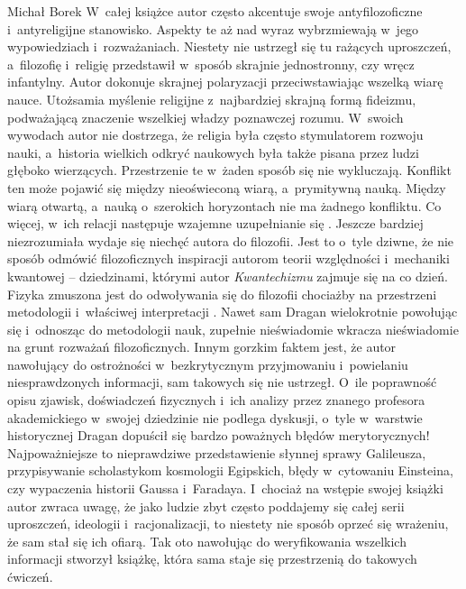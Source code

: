 \begin{newrevplenv}{Michał Borek}
W~całej książce autor często akcentuje swoje antyfilozoficzne i~antyreligijne stanowisko. Aspekty te aż nad wyraz wybrzmiewają w~jego wypowiedziach i~rozważaniach. Niestety nie ustrzegł się tu rażących uproszczeń, a~filozofię i~religię przedstawił w~sposób skrajnie jednostronny, czy wręcz infantylny. Autor dokonuje skrajnej polaryzacji przeciwstawiając wszelką wiarę nauce. Utożsamia myślenie religijne z~najbardziej skrajną formą fideizmu, podważającą znaczenie wszelkiej władzy poznawczej rozumu. W~swoich wywodach autor nie dostrzega, że religia była często stymulatorem rozwoju nauki, a~historia wielkich odkryć naukowych była także pisana przez ludzi głęboko wierzących. Przestrzenie te w~żaden sposób się nie wykluczają. Konflikt ten może pojawić się między nieoświeconą wiarą, a~prymitywną nauką. Między wiarą otwartą, a~nauką o~szerokich horyzontach nie ma żadnego konfliktu. Co więcej, w~ich relacji następuje wzajemne uzupełnianie się
\parencites[np.][]{heller_czlowiek_2016}[][]{heller_nauka_2019}[zob. także][]{rodzen_teologia_2021}. %
 Jeszcze bardziej niezrozumiała wydaje się niechęć autora do filozofii. Jest to o~tyle dziwne, że nie sposób odmówić filozoficznych inspiracji autorom teorii względności i~mechaniki kwantowej – dziedzinami, którymi autor \textit{Kwantechizmu} zajmuje się na co dzień. Fizyka zmuszona jest do odwoływania się do filozofii chociażby na przestrzeni metodologii i~właściwej interpretacji 
\parencites[więcej zob. np.][]{heller_how_2019}[zob. także][]{polak_philosophy_2019}. %
 Nawet sam Dragan wielokrotnie powołując się i~odnosząc do metodologii nauk, zupełnie nieświadomie wkracza nieświadomie na grunt rozważań filozoficznych. Innym gorzkim faktem jest, że autor nawołujący do ostrożności w~bezkrytycznym przyjmowaniu i~powielaniu niesprawdzonych informacji, sam takowych się nie ustrzegł. O~ile poprawność opisu zjawisk, doświadczeń fizycznych i~ich analizy przez znanego profesora akademickiego w~swojej dziedzinie nie podlega dyskusji, o~tyle w~warstwie historycznej Dragan dopuścił się bardzo poważnych błędów merytorycznych! Najpoważniejsze to nieprawdziwe przedstawienie słynnej sprawy Galileusza, przypisywanie scholastykom kosmologii Egipskich, błędy w~cytowaniu Einsteina, czy wypaczenia historii Gaussa i~Faradaya. I~chociaż na wstępie swojej książki autor zwraca uwagę, że jako ludzie zbyt często poddajemy się całej serii uproszczeń, ideologii i~racjonalizacji, to niestety nie sposób oprzeć się wrażeniu, że sam stał się ich ofiarą. Tak oto nawołując do weryfikowania wszelkich informacji stworzył książkę, która sama staje się przestrzenią do takowych ćwiczeń.


\end{newrevplenv}
